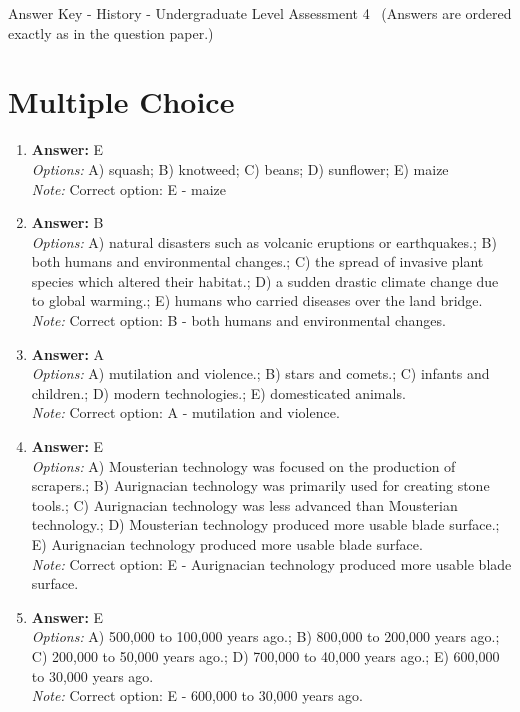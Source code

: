 \documentclass[12pt]{article}
\begin{document}
\begin{center}
Answer Key - History - Undergraduate Level Assessment 4 \
\small (Answers are ordered exactly as in the question paper.)
\end{center}

\section*{Multiple Choice}
\begin{enumerate}[label=\arabic*.]
\item \textbf{Answer:} E
\\ \textit{Options:} A) squash; B) knotweed; C) beans; D) sunflower; E) maize
\\ \textit{Note:} Correct option: E - maize
\item \textbf{Answer:} B
\\ \textit{Options:} A) natural disasters such as volcanic eruptions or earthquakes.; B) both humans and environmental changes.; C) the spread of invasive plant species which altered their habitat.; D) a sudden drastic climate change due to global warming.; E) humans who carried diseases over the land bridge.
\\ \textit{Note:} Correct option: B - both humans and environmental changes.
\item \textbf{Answer:} A
\\ \textit{Options:} A) mutilation and violence.; B) stars and comets.; C) infants and children.; D) modern technologies.; E) domesticated animals.
\\ \textit{Note:} Correct option: A - mutilation and violence.
\item \textbf{Answer:} E
\\ \textit{Options:} A) Mousterian technology was focused on the production of scrapers.; B) Aurignacian technology was primarily used for creating stone tools.; C) Aurignacian technology was less advanced than Mousterian technology.; D) Mousterian technology produced more usable blade surface.; E) Aurignacian technology produced more usable blade surface.
\\ \textit{Note:} Correct option: E - Aurignacian technology produced more usable blade surface.
\item \textbf{Answer:} E
\\ \textit{Options:} A) 500,000 to 100,000 years ago.; B) 800,000 to 200,000 years ago.; C) 200,000 to 50,000 years ago.; D) 700,000 to 40,000 years ago.; E) 600,000 to 30,000 years ago.
\\ \textit{Note:} Correct option: E - 600,000 to 30,000 years ago.
\end{enumerate}
\end{document}
